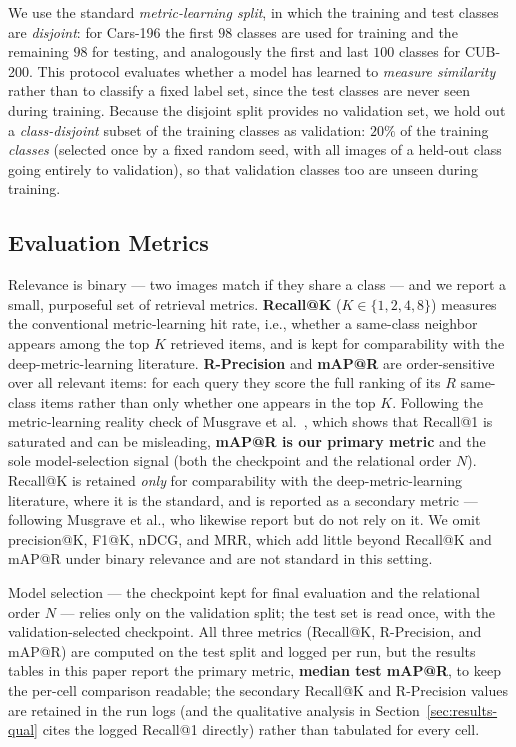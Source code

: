 \documentclass[11pt,letterpaper]{article}
\begin{document}
We use the standard \emph{metric-learning split}, in which the training and test
classes are \emph{disjoint}: for Cars-196 the first $98$ classes are used for
training and the remaining $98$ for testing, and analogously the first and last
$100$ classes for CUB-200. This protocol evaluates whether a model has learned to
\emph{measure similarity} rather than to classify a fixed label set, since the test
classes are never seen during training. Because the disjoint split provides no
validation set, we hold out a \emph{class-disjoint} subset of the training classes as
validation: $20\%$ of the training \emph{classes} (selected once by a fixed random
seed, with all images of a held-out class going entirely to validation), so that
validation classes too are unseen during training.

\subsection{Evaluation Metrics}
\label{sec:metrics}

Relevance is binary --- two images match if they share a class --- and we report a
small, purposeful set of retrieval metrics. \textbf{Recall@K} ($K \in \{1,2,4,8\}$)
measures the conventional metric-learning hit rate, i.e., whether a same-class
neighbor appears among the top $K$ retrieved items, and is kept for comparability
with the deep-metric-learning literature. \textbf{R-Precision} and \textbf{mAP@R}
are order-sensitive over all relevant items: for each query they score the full
ranking of its $R$ same-class items rather than only whether one appears in the top
$K$. Following the metric-learning reality check of Musgrave et
al.~\cite{musgrave2020reality}, which shows that Recall@1 is saturated and can be
misleading, \textbf{mAP@R is our primary metric} and the sole model-selection signal
(both the checkpoint and the relational order $N$). Recall@K is retained
\emph{only} for comparability with the deep-metric-learning literature, where it is
the standard, and is reported as a secondary metric --- following Musgrave et al.,
who likewise report but do not rely on it. We omit precision@K, F1@K, nDCG,
and MRR, which add little beyond Recall@K and mAP@R under binary relevance and are
not standard in this setting.

Model selection --- the checkpoint kept for final evaluation and the relational
order $N$ --- relies only on the validation split; the test set is read once, with
the validation-selected checkpoint. All three metrics (Recall@K, R-Precision, and
mAP@R) are computed on the test split and logged per run, but the results tables in
this paper report the primary metric, \textbf{median test mAP@R}, to keep the
per-cell comparison readable; the secondary Recall@K and R-Precision values are
retained in the run logs (and the qualitative analysis in
Section~\ref{sec:results-qual} cites the logged Recall@1 directly) rather than
tabulated for every cell.
\end{document}
